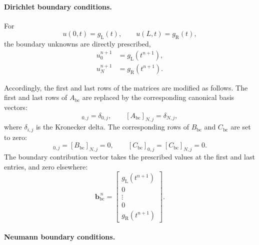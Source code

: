\documentclass{Configuration_Files/PoliMi3i_thesis}
\begin{document}
\paragraph{Dirichlet boundary conditions.}

For
\begin{equation*}
u(0,t)=g_{\mathrm L}(t),
\qquad
u(L,t)=g_{\mathrm R}(t),
\end{equation*}
the boundary unknowns are directly prescribed,
\begin{align*}
u_0^{n+1}&=g_{\mathrm L}(t^{n+1}),
\\
u_{N}^{n+1}&=g_{\mathrm R}(t^{n+1}).
\end{align*}

Accordingly, the first and last rows of the matrices are modified as follows. The first and last rows of $A_{\mathrm{bc}}$ are replaced by the corresponding canonical basis vectors:
\begin{equation*}
[A_{\mathrm{bc}}]_{0,j} = \delta_{0,j}, \qquad [A_{\mathrm{bc}}]_{N,j} = \delta_{N,j},
\end{equation*}
where $\delta_{i,j}$ is the Kronecker delta. The corresponding rows of $B_{\mathrm{bc}}$ and $C_{\mathrm{bc}}$ are set to zero:
\begin{equation*}
[B_{\mathrm{bc}}]_{0,j} = [B_{\mathrm{bc}}]_{N,j} = 0, \qquad [C_{\mathrm{bc}}]_{0,j} = [C_{\mathrm{bc}}]_{N,j} = 0.
\end{equation*}
The boundary contribution vector takes the prescribed values at the first and last entries, and zero elsewhere:
\begin{equation*}
\mathbf{b}_{\mathrm{bc}}^{\,n}
=
\begin{bmatrix}
g_{\mathrm L}(t^{n+1}) \\
0 \\
\vdots \\
0 \\
g_{\mathrm R}(t^{n+1})
\end{bmatrix}.
\end{equation*}

\paragraph{Neumann boundary conditions.}
\end{document}
